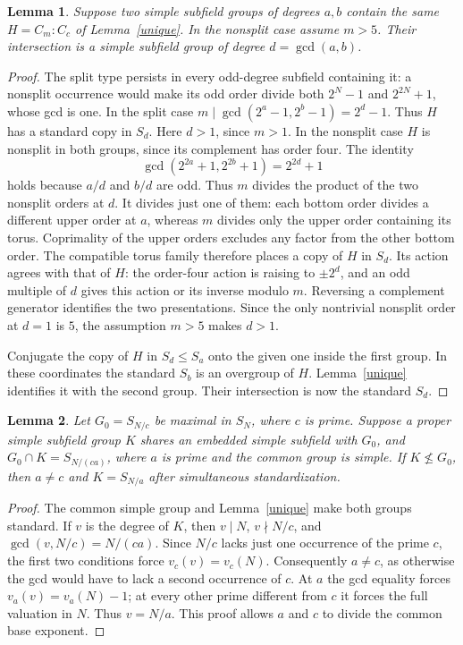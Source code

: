\documentclass[11pt,a4paper]{article}
\newtheorem{lemma}{Lemma}\newtheorem{theorem}[lemma]{Theorem}
\begin{document}
\begin{lemma}\label{meet}
Suppose two simple subfield groups of degrees $a,b$ contain the same
$H=C_m:C_c$ of Lemma~\ref{unique}. In the nonsplit case assume $m>5$.
Their intersection is a simple subfield group of degree $d=\gcd(a,b)$.
\end{lemma}
\begin{proof}
The split type persists in every odd-degree subfield containing it:
a nonsplit occurrence would make its odd order divide both
$2^N-1$ and $2^{2N}+1$, whose gcd is one.
In the split case $m\mid\gcd(2^a-1,2^b-1)=2^d-1$.
Thus $H$ has a standard copy in $S_d$. Here $d>1$, since $m>1$.
In the nonsplit case $H$ is nonsplit in both groups, since its
complement has order four. The identity
\[
 \gcd(2^{2a}+1,2^{2b}+1)=2^{2d}+1
\]
holds because $a/d$ and $b/d$ are odd. Thus $m$ divides the product
of the two nonsplit orders at $d$. It divides just one of them:
each bottom order divides a different upper order at $a$, whereas
$m$ divides only the upper order containing its torus. Coprimality
of the upper orders excludes any factor from the other bottom order.
The compatible torus family therefore places a copy of $H$ in $S_d$.
Its action agrees with that of $H$: the order-four action is raising
to $\pm2^d$, and an odd multiple of $d$ gives this action or its
inverse modulo $m$. Reversing a complement generator identifies the
two presentations. Since the only nontrivial nonsplit order at
$d=1$ is $5$, the assumption $m>5$ makes $d>1$.

Conjugate the copy of $H$ in $S_d\le S_a$ onto the given one inside
the first group. In these coordinates the standard $S_b$ is an
overgroup of $H$. Lemma~\ref{unique} identifies it with the second
group. Their intersection is now the standard $S_d$.
\end{proof}

\begin{lemma}\label{field}
Let $G_0=S_{N/c}$ be maximal in $S_N$, where $c$ is prime.
Suppose a proper simple subfield group $K$ shares an embedded
simple subfield with $G_0$, and
$G_0\cap K=S_{N/(ca)}$, where $a$ is prime and the common group
is simple. If $K\nleq G_0$, then $a\ne c$ and $K=S_{N/a}$ after
simultaneous standardization.
\end{lemma}
\begin{proof}
The common simple group and Lemma~\ref{unique} make both groups
standard. If $v$ is the degree of $K$, then
$v\mid N$, $v\nmid N/c$, and
$\gcd(v,N/c)=N/(ca)$. Since $N/c$ lacks just one occurrence of
the prime $c$, the first two conditions force $v_c(v)=v_c(N)$.
Consequently $a\ne c$, as otherwise the gcd would have to lack a
second occurrence of $c$. At $a$ the gcd equality forces
$v_a(v)=v_a(N)-1$; at every other prime different from $c$ it forces
the full valuation in $N$. Thus $v=N/a$. This proof allows $a$ and
$c$ to divide the common base exponent.
\end{proof}
\end{document}
